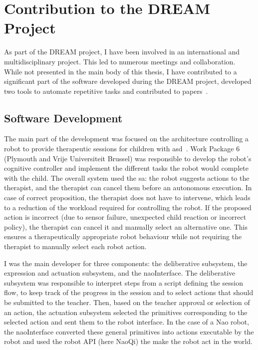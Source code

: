 \cleartooddpage
\chapter{Contribution to the DREAM Project} \label{app:dream}
\glsresetall

As part of the DREAM project, I have been involved in an international and multidisciplinary project. This led to numerous meetings and collaboration. While not presented in the main body of this thesis, I have contributed to a significant part of the software developed during the DREAM project, developed two tools to automate repetitive tasks and contributed to papers~\citep{esteban2017build,cao2018personalized}.

\section{Software Development}

The main part of the development was focused on the architecture controlling a robot to provide therapeutic sessions for children with \gls{asd}~\citep{esteban2017build}. Work Package 6 (Plymouth and Vrije Universiteit Brussel) was responsible to develop the robot's cognitive controller and implement the different tasks the robot would complete with the child. The overall system used the \gls{sa}: the robot suggests actions to the therapist, and the therapist can cancel them before an autonomous execution. In case of correct proposition, the therapist does not have to intervene, which leads to a reduction of the workload required for controlling the robot. If the proposed action is incorrect (due to sensor failure, unexpected child reaction or incorrect policy), the therapist can cancel it and manually select an alternative one. This ensures a therapeutically appropriate robot behaviour while not requiring the therapist to manually select each robot action. 

I was the main developer for three components: the deliberative subsystem, the expression and actuation subsystem, and the naoInterface. The deliberative subsystem was responsible to interpret steps from a script defining the session flow, to keep track of the progress in the session and to select actions that should be submitted to the teacher. Then, based on the teacher approval or selection of an action, the actuation subsystem selected the primitives corresponding to the selected  action and sent them to the robot interface. In the case of a Nao robot, the naoInterface converted these general primitives into actions executable by the robot and used the robot API (here NaoQi) the make the robot act in the world. 

